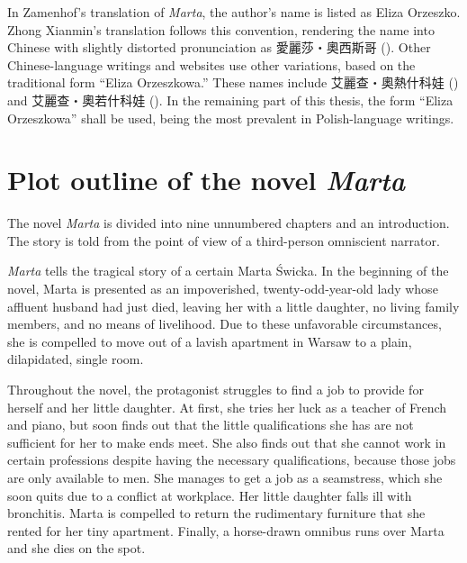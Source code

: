 In Zamenhof's translation of \textit{Marta}, the author's name is listed as Eliza Orzeszko.
Zhong Xianmin's translation follows this convention, rendering the name into Chinese with slightly distorted pronunciation as 愛麗莎・奧西斯哥 ().
Other Chinese-language writings and websites use other variations, based on the traditional form ``Eliza Orzeszkowa.''
These names include 艾麗查・奧熱什科娃 () and 艾麗查・奧若什科娃 (). In the remaining part of this thesis, the form ``Eliza Orzeszkowa'' shall be used, being the most prevalent in Polish-language writings.

\section{Plot outline of the novel \textit{Marta}}
The novel \textit{Marta} is divided into nine unnumbered chapters and an introduction. 
The story is told from the point of view of a third-person omniscient narrator.

\textit{Marta} tells the tragical story of a certain Marta Świcka.
In the beginning of the novel, Marta is presented as an impoverished, twenty-odd-year-old lady whose affluent husband had just died, leaving her with a little daughter, no living family members, and no means of livelihood.
Due to these unfavorable circumstances, she is compelled to move out of a lavish apartment in Warsaw to a plain, dilapidated, single room.

Throughout the novel, the protagonist struggles to find a job to provide for herself and her little daughter.
At first, she tries her luck as a teacher of French and piano, but soon finds out that the little qualifications she has are not sufficient for her to make ends meet.
She also finds out that she cannot work in certain professions despite having the necessary qualifications, because those jobs are only available to men.
She manages to get a job as a seamstress, which she soon quits due to a conflict at workplace.
Her little daughter falls ill with bronchitis.
Marta is compelled to return the rudimentary furniture that she rented for her tiny apartment.
Finally, a horse-drawn omnibus runs over Marta and she dies on the spot.
